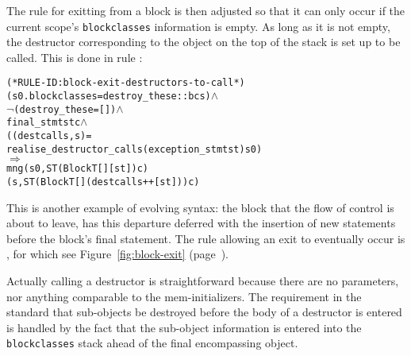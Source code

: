 \documentclass[11pt]{article}
\begin{document}
The rule for exitting from a block is then adjusted so that it can
only occur if the current scope's \texttt{blockclasses} information is
empty.  As long as it is not empty, the destructor corresponding to
the object on the top of the stack is set up to be called.  This is
done in rule :
\begin{center}
  \begin{minipage}{\textwidth}
\begin{alltt}
(* RULE-ID: block-exit-destructors-to-call *)
     (s0.blockclasses = destroy_these :: bcs) \(\land\)
     \(\neg\)(destroy_these = []) \(\land\)
     final_stmt st c \(\land\)
     ((destcalls, s) =
        realise_destructor_calls (exception_stmt st) s0)
   \(\Rightarrow\)
     mng (s0, ST (Block T [] [st]) c)
         (s, ST (Block T [] (destcalls ++ [st])) c)
\end{alltt}
  \end{minipage}
\end{center}
This is another example of evolving syntax: the block that the flow of
control is about to leave, has this departure deferred with the
insertion of new statements before the block's final statement.  The
rule allowing an exit to eventually occur is , for
which see Figure~\ref{fig:block-exit} (page~\pageref{fig:block-exit}).

Actually calling a destructor is straightforward because there are no
parameters, nor anything comparable to the mem-initializers.  The
requirement in the standard that sub-objects be destroyed before the
body of a destructor is entered is handled by the fact that the
sub-object information is entered into the \texttt{blockclasses} stack
ahead of the final encompassing object.
\end{document}
